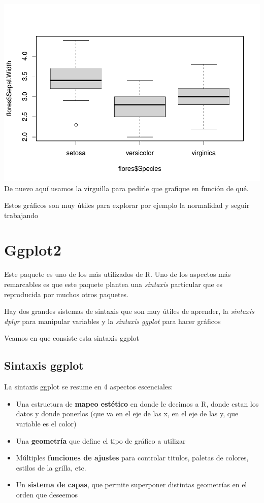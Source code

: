 \documentclass[
]{book}
\begin{document}
\includegraphics{Esatadistica_en_R_files/figure-latex/unnamed-chunk-141-1.pdf}
De nuevo aquí usamos la virguilla para pedirle que grafique en función de qué.

Estos gráficos son muy útiles para explorar por ejemplo la normalidad y seguir trabajando

\hypertarget{ggplot2}{%
\section{Ggplot2}\label{ggplot2}}

Este paquete es uno de los más utilizados de R. Uno de los aspectos más remarcables es que este paquete plantea una \emph{sintaxis} particular que es reproducida por muchos otros paquetes.

Hay dos grandes sistemas de sintaxis que son muy útiles de aprender, la \emph{sintaxis dplyr} para manipular variables y la \emph{sintaxis ggplot} para hacer gráficos

Veamos en que consiste esta sintaxis ggplot

\hypertarget{sintaxis-ggplot}{%
\subsection{Sintaxis ggplot}\label{sintaxis-ggplot}}

La sintaxis ggplot se resume en 4 aspectos escenciales:

\begin{itemize}
\item
  Una estructura de \textbf{mapeo estético} en donde le decimos a R, donde estan los datos y donde ponerlos (que va en el eje de las x, en el eje de las y, que variable es el color)
\item
  Una \textbf{geometría} que define el tipo de gráfico a utilizar
\item
  Múltiples \textbf{funciones de ajustes} para controlar titulos, paletas de colores, estilos de la grilla, etc.
\item
  Un \textbf{sistema de capas}, que permite superponer distintas geometrías en el orden que deseemos
\end{itemize}
\end{document}
